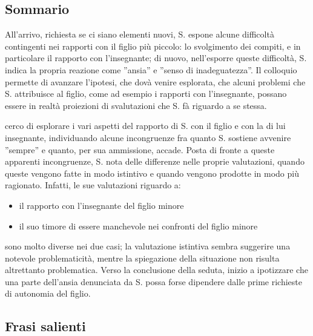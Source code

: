 \subsection*{Sommario}
All'arrivo, richiesta se ci siano elementi nuovi, S. espone alcune difficoltà contingenti nei rapporti con il figlio più piccolo: lo svolgimento dei compiti, e in particolare il rapporto con l'insegnante; di nuovo, nell'esporre queste difficoltà, S. indica la propria reazione come ''ansia'' e ''senso di inadeguatezza''. Il colloquio permette di avanzare l'ipotesi, che dovà venire esplorata, che alcuni problemi che S. attribuisce al figlio, come ad esempio i rapporti con l'insegnante, possano essere in realtà proiezioni di svalutazioni che S. fà riguardo a se stessa.
 
 cerco di esplorare i vari aspetti del rapporto di S. con il figlio e con la di lui insegnante, individuando alcune incongruenze fra quanto S. sostiene avvenire ''sempre'' e quanto, per sua ammissione, accade. Posta di fronte a queste apparenti incongruenze, S. nota delle differenze nelle proprie valutazioni, quando queste vengono fatte in modo istintivo e quando vengono prodotte in modo più ragionato. Infatti, le sue valutazioni riguardo a: 
\begin{itemize}
\item il rapporto con l'insegnante del figlio minore
\item il suo timore di essere manchevole nei confronti del figlio minore
\end{itemize}
sono molto diverse nei due casi; la valutazione istintiva sembra suggerire una notevole problematicità, mentre la spiegazione della situazione non risulta altrettanto problematica. Verso la conclusione della seduta, inizio a ipotizzare che una parte dell'ansia denunciata da S. possa forse dipendere dalle prime richieste di autonomia del figlio.

\subsection*{Frasi salienti}


